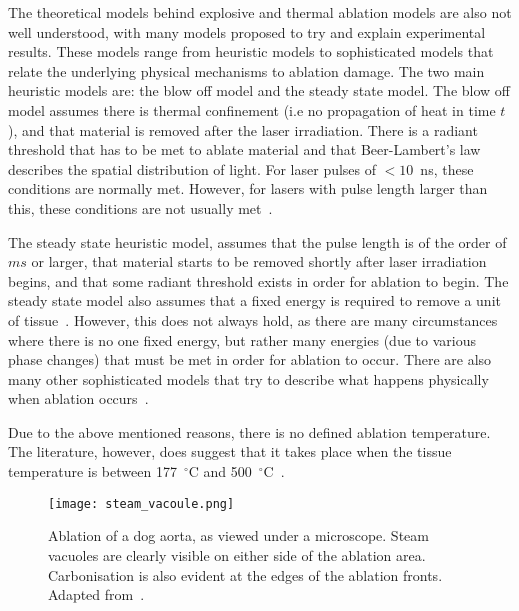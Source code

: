 The theoretical models behind explosive and thermal ablation models are also not well understood, with many models proposed to try and explain experimental results. These models range from heuristic models to sophisticated models that relate the underlying physical mechanisms to ablation damage. 
The two main heuristic models are: the blow off model and the steady state model. 
The blow off model assumes there is thermal confinement (i.e no propagation of heat in time $t$), and that material is removed after the laser irradiation. There is a radiant threshold that has to be met to ablate material and that Beer-Lambert's law describes the spatial distribution of light. For laser pulses of $<10$~ns, these conditions are normally met. However, for lasers with pulse length larger than this, these conditions are not usually met~\cite{vogel2003mechanisms,koren1984emission,andrew1983direct}. 

The steady state heuristic model, assumes that the pulse length is of the order of $ms$ or larger, that material starts to be removed shortly after laser irradiation begins, and that some radiant threshold exists in order for ablation to begin. The steady state model also assumes that a fixed energy is required to remove a unit of tissue~\cite{vogel2003mechanisms}. However, this does not always hold, as there are many circumstances where there is no one fixed energy, but rather many energies (due to various phase changes) that must be met in order for ablation to occur. There are also many other sophisticated models that try to describe what happens physically when ablation occurs~\cite{mckenzie1990physics,mckenzie1986three,majaron1999thermo}.

Due to the above mentioned reasons, there is no defined ablation temperature. The literature, however, does suggest that it takes place when the tissue temperature is between 177~${^{\circ}}$C and 500~${^{\circ}}$C~\cite{gerstmann1994char,mckenzie1986three,sagi1992heating}. 

\begin{figure}	
\vspace{-10pt}
	\centering
	\texttt{[image: steam\_vacoule.png]}
	\caption{Ablation of a dog aorta, as viewed under a microscope. Steam vacuoles are clearly visible on either side of the ablation area. Carbonisation is also evident at the edges of the ablation fronts. Adapted from~\cite{welch2011optical}.}
	\label{fig:histology}
	\vspace{-10pt}
\end{figure}

